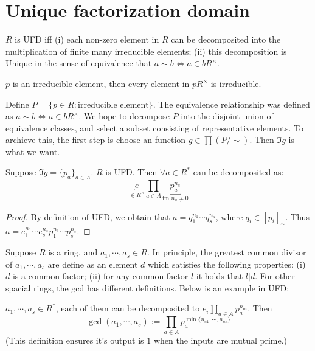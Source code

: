\section{Unique factorization domain}
\begin{definition}
    $R$ is UFD iff (i) each non-zero element in $R$ can be decomposited into the multiplication of finite many irreducible elements; (ii) this decomposition is Unique in the sense of equivalence that $a \sim b \Leftrightarrow a \in bR^{\times}$.
\end{definition}


\begin{corollary}
    $p$ is an irreducible element, then every element in $p R^{\times}$ is irreducible.
\end{corollary}


Define $P = \{ p \in R: \text{irreducible element} \}$. The equivalence relationship was defined as $a \sim b \Leftrightarrow a \in b R^{\times}$. We hope to decompose $P$ into the disjoint union of equivalence classes, and select a subset consisting of representative elements. To archieve this, the first step is choose an function $g \in \prod (P / \sim)$. Then $\Im g$ is what we want.


\begin{proposition}
    Suppose $\Im g = \{ p_a \}_{a \in A}$. $R$ is UFD. Then $\forall a \in R^*$ can be decomposited as:
    \[
        \underbracket{e}_{\in R^{\times}} \prod_{a \in A} \underbracket{p_a^{n_a}}_{\text{fm } n_a \neq 0 } 
    \]
\end{proposition}

\begin{proof}
    By definition of UFD, we obtain that $a = q_1^{n_1} \cdots q_s^{n_s}$, where $q_i \in [p_i]_{\sim}$. Thus $a = e_1^{n_1} \cdots e_s^{n_s} p_1^{n_1} \cdots p_s^{n_s}$.
\end{proof}



Suppose $R$ is a ring, and $a_1, \cdots, a_s \in R$. In principle, the greatest common divisor of $a_1, \cdots, a_s$ are define as an element $d$ which satisfies the following properties: (i) $d$ is a common factor; (ii) for any common factor $l$ it holds that $l | d$. For other spacial rings, the gcd has different definitions. Below is an example in UFD:



\begin{definition}
    $a_1 , \cdots, a_s \in R^*$, each of them can be decomposited to $e_i \prod_{a \in A} p_a^{n_{ai}}$. Then
    \[
        \gcd(a_1, \cdots, a_s) := \prod_{a \in A} p_a^{\min\{ n_{a1}, \cdots, n_{as} \}}
    \]
    (This definition ensures it's output is $1$ when the inputs are mutual prime.)
\end{definition}





